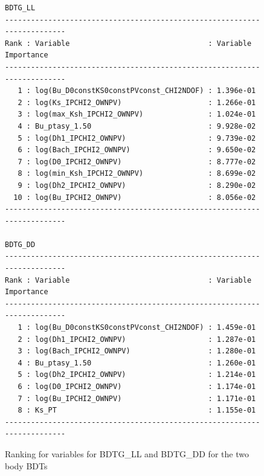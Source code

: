 \begin{figure}
\begin{verbatim}
BDTG_LL
-------------------------------------------------------------------------
Rank : Variable                                : Variable Importance
-------------------------------------------------------------------------
   1 : log(Bu_D0constKS0constPVconst_CHI2NDOF) : 1.396e-01
   2 : log(Ks_IPCHI2_OWNPV)                    : 1.266e-01
   3 : log(max_Ksh_IPCHI2_OWNPV)               : 1.024e-01
   4 : Bu_ptasy_1.50                           : 9.928e-02
   5 : log(Dh1_IPCHI2_OWNPV)                   : 9.739e-02
   6 : log(Bach_IPCHI2_OWNPV)                  : 9.650e-02
   7 : log(D0_IPCHI2_OWNPV)                    : 8.777e-02
   8 : log(min_Ksh_IPCHI2_OWNPV)               : 8.699e-02
   9 : log(Dh2_IPCHI2_OWNPV)                   : 8.290e-02
  10 : log(Bu_IPCHI2_OWNPV)                    : 8.056e-02
-------------------------------------------------------------------------

BDTG_DD
-------------------------------------------------------------------------
Rank : Variable                                : Variable Importance
-------------------------------------------------------------------------
   1 : log(Bu_D0constKS0constPVconst_CHI2NDOF) : 1.459e-01
   2 : log(Dh1_IPCHI2_OWNPV)                   : 1.287e-01
   3 : log(Bach_IPCHI2_OWNPV)                  : 1.280e-01
   4 : Bu_ptasy_1.50                           : 1.260e-01
   5 : log(Dh2_IPCHI2_OWNPV)                   : 1.214e-01
   6 : log(D0_IPCHI2_OWNPV)                    : 1.174e-01
   7 : log(Bu_IPCHI2_OWNPV)                    : 1.171e-01
   8 : Ks_PT                                   : 1.155e-01
-------------------------------------------------------------------------
\end{verbatim}
\caption{Ranking for variables for BDTG\_LL and BDTG\_DD for the two body BDTs}
\label{variableranking2body}
\end{figure}

